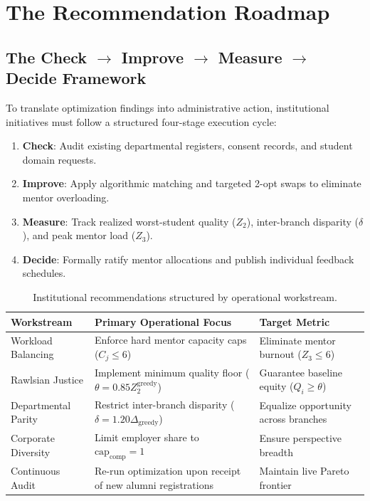 \documentclass[11pt,a4paper,oneside]{report}
\begin{document}
\chapter{The Recommendation Roadmap}

\section{The Check $\rightarrow$ Improve $\rightarrow$ Measure $\rightarrow$ Decide Framework}
To translate optimization findings into administrative action, institutional initiatives must follow a structured four-stage execution cycle:
\begin{enumerate}
    \item \textbf{Check}: Audit existing departmental registers, consent records, and student domain requests.
    \item \textbf{Improve}: Apply algorithmic matching and targeted 2-opt swaps to eliminate mentor overloading.
    \item \textbf{Measure}: Track realized worst-student quality ($Z_2$), inter-branch disparity ($\delta$), and peak mentor load ($Z_3$).
    \item \textbf{Decide}: Formally ratify mentor allocations and publish individual feedback schedules.
\end{enumerate}

\begin{table}[htbp]
\centering
\caption{Institutional recommendations structured by operational workstream.}
\label{tab:roadmap}
\begin{tabularx}{\textwidth}{lXX}
\toprule
\textbf{Workstream} & \textbf{Primary Operational Focus} & \textbf{Target Metric} \\
\midrule
Workload Balancing & Enforce hard mentor capacity caps ($C_j \le 6$) & Eliminate mentor burnout ($Z_3 \le 6$) \\
Rawlsian Justice & Implement minimum quality floor ($\theta = 0.85 Z_2^{\text{greedy}}$) & Guarantee baseline equity ($Q_i \ge \theta$) \\
Departmental Parity & Restrict inter-branch disparity ($\delta = 1.20 \Delta_{\text{greedy}}$) & Equalize opportunity across branches \\
Corporate Diversity & Limit employer share to $\text{cap}_{\text{comp}} = 1$ & Ensure perspective breadth \\
Continuous Audit & Re-run optimization upon receipt of new alumni registrations & Maintain live Pareto frontier \\
\bottomrule
\end{tabularx}
\end{table}
\end{document}
